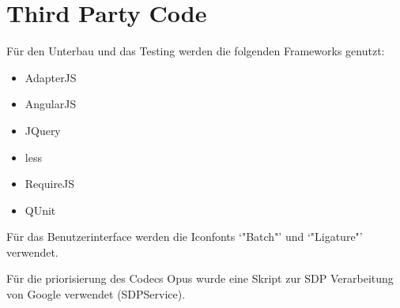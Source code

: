 \section{Third Party Code}
	Für den Unterbau und das Testing werden die folgenden Frameworks genutzt:
	\begin{itemize}
		\item{AdapterJS}
		\item{AngularJS}
		\item{JQuery}
		\item{less}
		\item{RequireJS}
		\item{QUnit}
	\end{itemize}

	Für das Benutzerinterface werden die Iconfonts `"Batch"' und `"Ligature"' verwendet.

	Für die priorisierung des Codecs Opus wurde eine Skript zur SDP Verarbeitung von Google verwendet (SDPService).